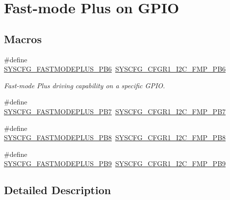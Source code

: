 \hypertarget{group___s_y_s_c_f_g___fast_mode_plus___g_p_i_o}{}\section{Fast-\/mode Plus on G\+P\+IO}
\label{group___s_y_s_c_f_g___fast_mode_plus___g_p_i_o}
\subsection*{Macros}
\begin{DoxyCompactItemize}
\item 
\#define \hyperlink{group___s_y_s_c_f_g___fast_mode_plus___g_p_i_o_ga1f9beaf68b00ae5598cb8d930da05704}{S\+Y\+S\+C\+F\+G\+\_\+\+F\+A\+S\+T\+M\+O\+D\+E\+P\+L\+U\+S\+\_\+\+P\+B6}~\hyperlink{group___peripheral___registers___bits___definition_ga60cd7909ee96ba91280daff7fac4f76a}{S\+Y\+S\+C\+F\+G\+\_\+\+C\+F\+G\+R1\+\_\+\+I2\+C\+\_\+\+F\+M\+P\+\_\+\+P\+B6}
\begin{DoxyCompactList}\small\item\em Fast-\/mode Plus driving capability on a specific G\+P\+IO. \end{DoxyCompactList}\item 
\#define \hyperlink{group___s_y_s_c_f_g___fast_mode_plus___g_p_i_o_ga4b939ef5ec69e81277ef2323d5917eb5}{S\+Y\+S\+C\+F\+G\+\_\+\+F\+A\+S\+T\+M\+O\+D\+E\+P\+L\+U\+S\+\_\+\+P\+B7}~\hyperlink{group___peripheral___registers___bits___definition_ga65a2cd1a2a0ef7012e87fa06c5e8cb05}{S\+Y\+S\+C\+F\+G\+\_\+\+C\+F\+G\+R1\+\_\+\+I2\+C\+\_\+\+F\+M\+P\+\_\+\+P\+B7}
\item 
\#define \hyperlink{group___s_y_s_c_f_g___fast_mode_plus___g_p_i_o_ga2cd8442a02f25ed8e7e0ba6e5723edd4}{S\+Y\+S\+C\+F\+G\+\_\+\+F\+A\+S\+T\+M\+O\+D\+E\+P\+L\+U\+S\+\_\+\+P\+B8}~\hyperlink{group___peripheral___registers___bits___definition_ga8df0fd48121dfd545c2e005da130d867}{S\+Y\+S\+C\+F\+G\+\_\+\+C\+F\+G\+R1\+\_\+\+I2\+C\+\_\+\+F\+M\+P\+\_\+\+P\+B8}
\item 
\#define \hyperlink{group___s_y_s_c_f_g___fast_mode_plus___g_p_i_o_ga71c50ae2406cd9b6dff73cd9cd189c3d}{S\+Y\+S\+C\+F\+G\+\_\+\+F\+A\+S\+T\+M\+O\+D\+E\+P\+L\+U\+S\+\_\+\+P\+B9}~\hyperlink{group___peripheral___registers___bits___definition_gaee2ff2bb9e8f061cdc2de4b585f08747}{S\+Y\+S\+C\+F\+G\+\_\+\+C\+F\+G\+R1\+\_\+\+I2\+C\+\_\+\+F\+M\+P\+\_\+\+P\+B9}
\end{DoxyCompactItemize}


\subsection{Detailed Description}


